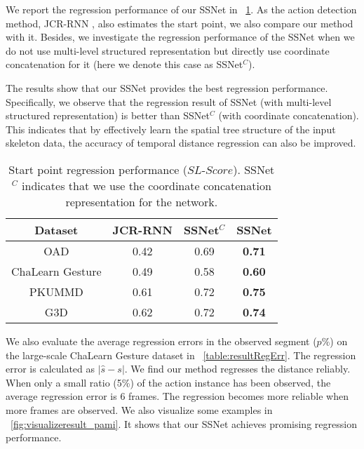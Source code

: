 \documentclass[10pt,twocolumn,letterpaper]{article}
\begin{document}
We report the regression performance of our SSNet in \tablename{~\ref{table:resultSLScore}}.
As the action detection method, JCR-RNN \cite{li2016online}, also estimates the start point, we also compare our method with it.
Besides, we investigate the regression performance of the SSNet when we do not use multi-level structured representation but directly use coordinate concatenation for it
(here we denote this case as SSNet$^C$).

The results show that our SSNet provides the best regression performance.
Specifically, we observe that the regression result of SSNet (with multi-level structured representation) is better than SSNet$^C$ (with coordinate concatenation).
This indicates that by effectively learn the spatial tree structure of the input skeleton data,
the accuracy of temporal distance regression can also be improved.




\begin{table}[tbp]
	\caption{Start point regression performance ($SL$-$Score$).
SSNet$^C$ indicates that we use the coordinate concatenation representation for the network.}
	\label{table:resultSLScore}
	\centering
	\small
	\begin{tabular}{cccc}
		\toprule
Dataset              & JCR-RNN  &  SSNet$^C$   &      SSNet    \\
		\midrule
		OAD                  &  0.42    &   0.69    &   \textbf{0.71}     \\
        ChaLearn Gesture     &  0.49    &   0.58    &   \textbf{0.60}     \\
        PKUMMD               &  0.61    &   0.72    &   \textbf{0.75}      \\
		G3D                  &  0.62    &   0.72    &   \textbf{0.74}         \\
		\bottomrule
	\end{tabular}
\end{table}

We also evaluate the average regression errors in the observed segment ($p\%$) on the large-scale ChaLearn Gesture dataset in \tablename{~\ref{table:resultRegErr}}. The regression error is calculated as $|\hat{s} - s|$.
We find our method regresses the distance reliably.
When only a small ratio (5\%) of the action instance has been observed, the average regression error is 6 frames.  The regression becomes more reliable when more frames are observed.
We also visualize some examples in \figurename{~\ref{fig:visualizeresult_pami}}.
It shows that our SSNet achieves promising regression performance.
\end{document}
